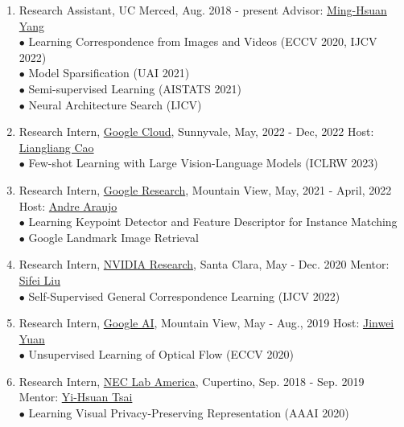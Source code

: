 \documentclass[letterpaper]{article}
\begin{document}
\begin{enumerate}

\item Research Assistant, UC Merced, Aug. 2018 - present \hfill Advisor: \href{http://faculty.ucmerced.edu/mhyang/}{Ming-Hsuan Yang}\\
	$\bullet$ Learning Correspondence from Images and Videos (ECCV 2020, IJCV 2022) \\
	$\bullet$ Model Sparsification (UAI 2021) \\
	$\bullet$ Semi-supervised Learning (AISTATS 2021) \\
	$\bullet$ Neural Architecture Search (IJCV)
	
\item Research Intern, \href{https://cloud.google.com/products/ai}{Google Cloud}, Sunnyvale, May, 2022 - Dec, 2022 \hfill Host: \href{http://llcao.net/}{Liangliang Cao} \\
	$\bullet$ Few-shot Learning with Large Vision-Language Models (ICLRW 2023)

\item Research Intern, \href{https://research.google}{Google Research}, Mountain View, May, 2021 - April, 2022 \hfill Host: \href{https://andrefaraujo.github.io/}{Andre Araujo} \\
	$\bullet$ Learning Keypoint Detector and Feature Descriptor for Instance Matching \\
	$\bullet$ Google Landmark Image Retrieval
	
\item Research Intern, \href{https://www.nvidia.com/en-us/research/}{NVIDIA Research}, Santa Clara, May - Dec. 2020 \hfill Mentor: \href{https://www.sifeiliu.net/}{Sifei Liu}\\
	$\bullet$ Self-Supervised General Correspondence Learning (IJCV 2022)

\item Research Intern, \href{https://ai.google/}{Google AI}, Mountain View, May - Aug., 2019 \hfill Host: \href{mailto:jinwei@google.com}{Jinwei Yuan}\\
	$\bullet$ Unsupervised Learning of Optical Flow (ECCV 2020)

\item Research Intern, \href{https://www.nec-labs.com//}{NEC Lab America}, Cupertino, Sep. 2018 - Sep. 2019 \hfill Mentor: \href{https://sites.google.com/site/yihsuantsai/}{Yi-Hsuan Tsai} \\
 	$\bullet$ Learning Visual Privacy-Preserving Representation (AAAI 2020)


\end{enumerate}
\end{document}
